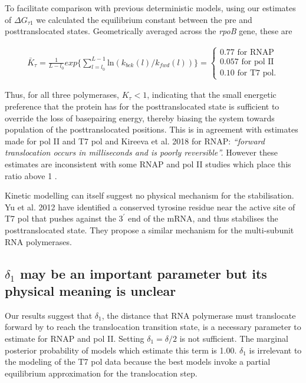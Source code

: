\documentclass[10pt,letterpaper]{article}
\begin{document}
To facilitate comparison with previous deterministic models, using our estimates of $\Delta G_{\tau 1}$ we calculated the equilibrium constant between the pre and posttranslocated states. Geometrically averaged across the \textit{rpoB} gene, these are




\begin{eqnarray}
\bar{K}_\tau = \frac{1}{L - l_0} exp \{ \sum\limits_{l=l_0}^{L-1} \text{ln} (k_{bck}(l) / k_{fwd}(l)) \} = \begin{cases} 0.77 \text{ for RNAP} \\ 0.057 \text{ for pol II} \\ 0.10 \text{ for T7 pol.}  \end{cases}
\end{eqnarray}


Thus, for all three polymerases, $K_\tau < 1$, indicating that the small energetic preference that the protein has for the posttranslocated state is sufficient to override the loss of basepairing energy, thereby biasing the system towards population of the posttranslocated positions. This is in agreement with estimates made for pol II and T7 pol \cite{larson2012trigger, schweikhard2014transcription, thomen2008t7,yin2004structural, yu2012small} and Kireeva et al. 2018 \cite{kireeva2018rna} for RNAP: \textit{``forward translocation occurs in milliseconds and is poorly reversible''.} However these estimates are inconsistent with some RNAP and pol II studies which place this ratio above 1  \cite{abbondanzieri2005direct, kireeva2008transient, maoileidigh2011unified, Dangkulwanich2013complete}.

Kinetic modelling can itself suggest no physical mechanism for the stabilisation. Yu et al. 2012 \cite{yu2012small} have identified a conserved tyrosine residue near the active site of T7 pol that pushes against the $3^\prime$ end of the mRNA, and thus stabilises the posttranslocated state. They propose a similar mechanism for the multi-subunit RNA polymerases.  \par




\subsection*{$\delta_1$ may be an important parameter but its physical meaning is unclear}

Our results suggest that $\delta_1$, the distance that RNA polymerase must translocate forward by to reach the translocation transition state, is a necessary parameter to estimate for RNAP and pol II. Setting $\delta_1 = \delta / 2$ is not sufficient. The marginal posterior probability of models which estimate this term is 1.00. $\delta_1$ is irrelevant to the modeling of the T7 pol data because the best models invoke a partial equilibrium approximation for the translocation step.
\end{document}
